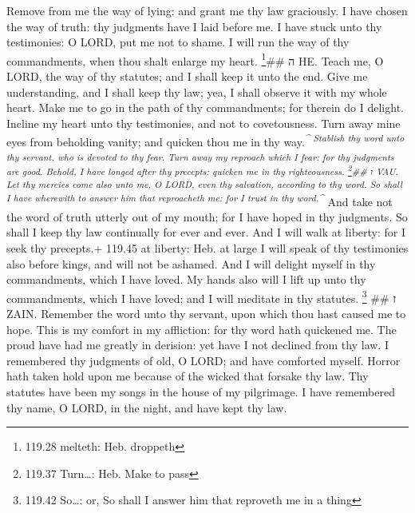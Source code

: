 Remove from me the way of lying: and grant me thy law
graciously.  I have chosen the way of truth: thy judgments
have I laid before me.  I have stuck unto thy testimonies:
O LORD, put me not to shame.  I will run the way of thy
commandments, when thou shalt enlarge my heart. \footnote{119.28
  melteth: Heb. droppeth}\#\# ה HE.  Teach me, O LORD, the
way of thy statutes; and I shall keep it unto the end. 
Give me understanding, and I shall keep thy law; yea, I shall observe it
with my whole heart.  Make me to go in the path of thy
commandments; for therein do I delight.  Incline my heart
unto thy testimonies, and not to covetousness.  Turn away
mine eyes from beholding vanity; and quicken thou me in thy
way.\textsuperscript{\emph{\^{}  Stablish thy word unto thy
servant, who is devoted to thy fear.  Turn away my reproach
which I fear: for thy judgments are good.  Behold, I have
longed after thy precepts: quicken me in thy righteousness.
\footnote{119.37 Turn\ldots: Heb. Make to pass}\#\# ו VAU. 
Let thy mercies come also unto me, O LORD, even thy salvation, according
to thy word.  So shall I have wherewith to answer him that
reproacheth me: for I trust in thy word.\^{}}}  And take
not the word of truth utterly out of my mouth; for I have hoped in thy
judgments.  So shall I keep thy law continually for ever
and ever.  And I will walk at liberty: for I seek thy
precepts.+ 119.45 at liberty: Heb. at large  I will speak
of thy testimonies also before kings, and will not be ashamed.
 And I will delight myself in thy commandments, which I
have loved.  My hands also will I lift up unto thy
commandments, which I have loved; and I will meditate in thy statutes.
\footnote{119.42 So\ldots: or, So shall I answer him that reproveth me
  in a thing} \#\# ז ZAIN.  Remember the word unto thy
servant, upon which thou hast caused me to hope.  This is
my comfort in my affliction: for thy word hath quickened me.
 The proud have had me greatly in derision: yet have I not
declined from thy law.  I remembered thy judgments of old,
O LORD; and have comforted myself.  Horror hath taken hold
upon me because of the wicked that forsake thy law.  Thy
statutes have been my songs in the house of my pilgrimage. 
I have remembered thy name, O LORD, in the night, and have kept thy law.
